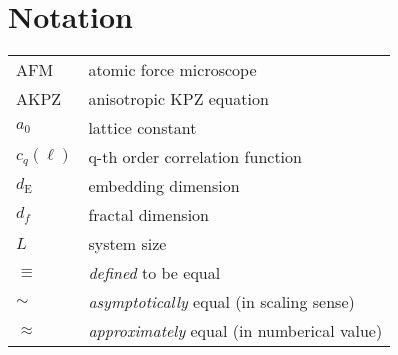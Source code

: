 
\chapter*{Notation}

\begin{tabular}{@{}ll}
AFM & atomic force microscope\\
AKPZ & anisotropic KPZ equation\\
$a_0$ & lattice constant\\
$c_q(\ell)$ & q-th order correlation function\\
$d_{\mathrm {E}}$ & embedding dimension\\
$d_f$ & fractal dimension\\
$L$ & system size \\
$\equiv$ & {\em defined} to be equal\\
$\sim$ & {\em asymptotically} equal (in scaling sense)\\
$\approx$ & {\em approximately} equal (in numberical value)
\end{tabular}

\endinput




